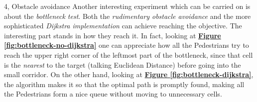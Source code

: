 \documentclass[10pt,a4paper]{article}
\begin{document}
\begin{task}{4, Obstacle avoidance}
Another interesting experiment which can be carried on is about the \textit{bottleneck test}. Both the \textit{rudimentary obstacle avoidance} and the more sophisticated \textit{Dijkstra implementation} can achieve reaching the objective. The interesting part stands in how they reach it. In fact, looking at \textbf{\hyperref[fig:bottleneck-no-dijkstra]{Figure \ref{fig:bottleneck-no-dijkstra}}} one can appreciate how all the Pedestrians try to reach the upper right corner of the leftmost part of the bottleneck, since that cell is the \textit{nearest} to the target (talking Euclidean Distance) before going into the small corridor. On the other hand, looking at \textbf{\hyperref[fig:bottleneck-dijkstra]{Figure \ref{fig:bottleneck-dijkstra}}}, the algorithm makes it so that the optimal path is promptly found, making all the Pedestrians form a nice queue without moving to unnecessary cells.


\end{task}
\end{document}

